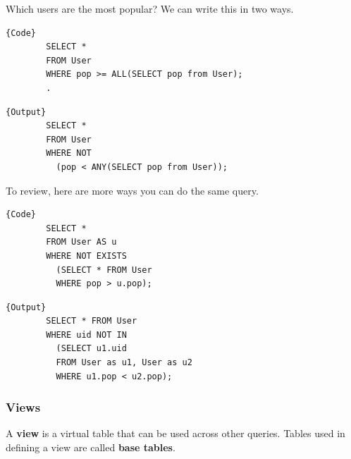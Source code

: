     \begin{example}
      Which users are the most popular? We can write this in two ways. 

      \noindent\begin{minipage}{.5\textwidth}
      \begin{lstlisting}[]{Code}
        SELECT * 
        FROM User 
        WHERE pop >= ALL(SELECT pop from User); 
        .
      \end{lstlisting}
      \end{minipage}
      \hfill
      \begin{minipage}{.49\textwidth}
      \begin{lstlisting}[]{Output}
        SELECT * 
        FROM User 
        WHERE NOT 
          (pop < ANY(SELECT pop from User)); 
      \end{lstlisting}
      \end{minipage}

      To review, here are more ways you can do the same query. 

      \noindent\begin{minipage}{.5\textwidth}
      \begin{lstlisting}[]{Code}
        SELECT * 
        FROM User AS u 
        WHERE NOT EXISTS  
          (SELECT * FROM User
          WHERE pop > u.pop); 
      \end{lstlisting}
      \end{minipage}
      \hfill
      \begin{minipage}{.49\textwidth}
      \begin{lstlisting}[]{Output}
        SELECT * FROM User 
        WHERE uid NOT IN 
          (SELECT u1.uid
          FROM User as u1, User as u2 
          WHERE u1.pop < u2.pop); 
      \end{lstlisting}
      \end{minipage}
    \end{example}
  
  \subsubsection{Views}

    \begin{definition}[View]
      A \textbf{view} is a virtual table that can be used across other queries. Tables used in defining a view are called \textbf{base tables}. 
    \end{definition}

